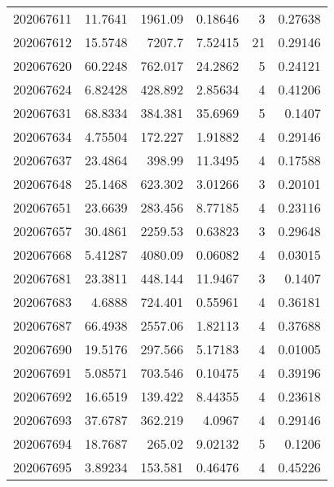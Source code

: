 \begin{tabular}{rrrrrr}
 202067611 &         11.7641  &     1961.09   &            0.18646 &           3 & 0.27638 \\
 202067612 &         15.5748  &     7207.7    &            7.52415 &          21 & 0.29146 \\
 202067620 &         60.2248  &      762.017  &           24.2862  &           5 & 0.24121 \\
 202067624 &          6.82428 &      428.892  &            2.85634 &           4 & 0.41206 \\
 202067631 &         68.8334  &      384.381  &           35.6969  &           5 & 0.1407  \\
 202067634 &          4.75504 &      172.227  &            1.91882 &           4 & 0.29146 \\
 202067637 &         23.4864  &      398.99   &           11.3495  &           4 & 0.17588 \\
 202067648 &         25.1468  &      623.302  &            3.01266 &           3 & 0.20101 \\
 202067651 &         23.6639  &      283.456  &            8.77185 &           4 & 0.23116 \\
 202067657 &         30.4861  &     2259.53   &            0.63823 &           3 & 0.29648 \\
 202067668 &          5.41287 &     4080.09   &            0.06082 &           4 & 0.03015 \\
 202067681 &         23.3811  &      448.144  &           11.9467  &           3 & 0.1407  \\
 202067683 &          4.6888  &      724.401  &            0.55961 &           4 & 0.36181 \\
 202067687 &         66.4938  &     2557.06   &            1.82113 &           4 & 0.37688 \\
 202067690 &         19.5176  &      297.566  &            5.17183 &           4 & 0.01005 \\
 202067691 &          5.08571 &      703.546  &            0.10475 &           4 & 0.39196 \\
 202067692 &         16.6519  &      139.422  &            8.44355 &           4 & 0.23618 \\
 202067693 &         37.6787  &      362.219  &            4.0967  &           4 & 0.29146 \\
 202067694 &         18.7687  &      265.02   &            9.02132 &           5 & 0.1206  \\
 202067695 &          3.89234 &      153.581  &            0.46476 &           4 & 0.45226 \\

\end{tabular}
